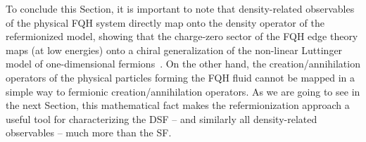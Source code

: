 \documentclass[twocolumn,pra,superscriptaddress,noshowpacs]{revtex4}
\begin{document}
To conclude this Section, it is important to note that density-related observables of the physical FQH system directly map onto the density operator of the refermionized model, showing that the charge-zero sector of the FQH edge theory maps (at low energies) onto a chiral generalization of the non-linear Luttinger model of one-dimensional fermions~\cite{ImambekovGlazman_Science_2009,ImambekovGlazman_RMP_2012}.
On the other hand, the creation/annihilation operators of the physical particles forming the FQH fluid cannot be mapped in a simple way to fermionic creation/annihilation operators. 
As we are going to see in the next Section, this mathematical fact makes the refermionization approach %
a useful tool for characterizing the DSF -- and similarly all density-related observables -- much more than the SF.



\end{document}
